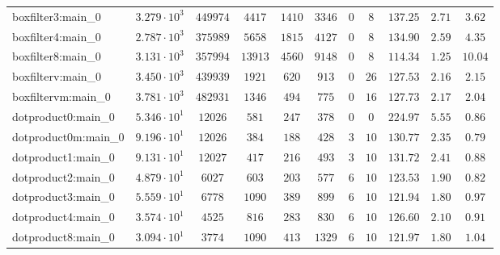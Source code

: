 \begin{tabular}{|l|c|c|c|c|c|c|c|c|c|c|}
boxfilter3:main\_0             & $ 3.279 \cdot 10^{3} $ & $ 449974   $ & $ 4417   $ & $ 1410   $ & $ 3346   $ & $ 0    $ & $ 8    $ & $ 137.25      $ & $ 2.71    $ & $ 3.62    $ \\
boxfilter4:main\_0             & $ 2.787 \cdot 10^{3} $ & $ 375989   $ & $ 5658   $ & $ 1815   $ & $ 4127   $ & $ 0    $ & $ 8    $ & $ 134.90      $ & $ 2.59    $ & $ 4.35    $ \\
boxfilter8:main\_0             & $ 3.131 \cdot 10^{3} $ & $ 357994   $ & $ 13913  $ & $ 4560   $ & $ 9148   $ & $ 0    $ & $ 8    $ & $ 114.34      $ & $ 1.25    $ & $ 10.04   $ \\
boxfilterv:main\_0             & $ 3.450 \cdot 10^{3} $ & $ 439939   $ & $ 1921   $ & $ 620    $ & $ 913    $ & $ 0    $ & $ 26   $ & $ 127.53      $ & $ 2.16    $ & $ 2.15    $ \\
boxfiltervm:main\_0            & $ 3.781 \cdot 10^{3} $ & $ 482931   $ & $ 1346   $ & $ 494    $ & $ 775    $ & $ 0    $ & $ 16   $ & $ 127.73      $ & $ 2.17    $ & $ 2.04    $ \\
dotproduct0:main\_0            & $ 5.346 \cdot 10^{1} $ & $ 12026    $ & $ 581    $ & $ 247    $ & $ 378    $ & $ 0    $ & $ 0    $ & $ 224.97      $ & $ 5.55    $ & $ 0.86    $ \\
dotproduct0m:main\_0           & $ 9.196 \cdot 10^{1} $ & $ 12026    $ & $ 384    $ & $ 188    $ & $ 428    $ & $ 3    $ & $ 10   $ & $ 130.77      $ & $ 2.35    $ & $ 0.79    $ \\
dotproduct1:main\_0            & $ 9.131 \cdot 10^{1} $ & $ 12027    $ & $ 417    $ & $ 216    $ & $ 493    $ & $ 3    $ & $ 10   $ & $ 131.72      $ & $ 2.41    $ & $ 0.88    $ \\
dotproduct2:main\_0            & $ 4.879 \cdot 10^{1} $ & $ 6027     $ & $ 603    $ & $ 203    $ & $ 577    $ & $ 6    $ & $ 10   $ & $ 123.53      $ & $ 1.90    $ & $ 0.82    $ \\
dotproduct3:main\_0            & $ 5.559 \cdot 10^{1} $ & $ 6778     $ & $ 1090   $ & $ 389    $ & $ 899    $ & $ 6    $ & $ 10   $ & $ 121.94      $ & $ 1.80    $ & $ 0.97    $ \\
dotproduct4:main\_0            & $ 3.574 \cdot 10^{1} $ & $ 4525     $ & $ 816    $ & $ 283    $ & $ 830    $ & $ 6    $ & $ 10   $ & $ 126.60      $ & $ 2.10    $ & $ 0.91    $ \\
dotproduct8:main\_0            & $ 3.094 \cdot 10^{1} $ & $ 3774     $ & $ 1090   $ & $ 413    $ & $ 1329   $ & $ 6    $ & $ 10   $ & $ 121.97      $ & $ 1.80    $ & $ 1.04    $ \\

\end{tabular}
